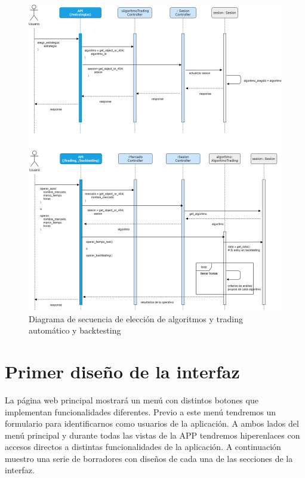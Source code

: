 \begin{figure}[h] 
	\includegraphics[width=1.35\textwidth]{imagenes/diagramas_secuencia/algoritmos_secuencia.png}
	\caption{Diagrama de secuencia de elección de algoritmos y trading automático y backtesting} \label{algoritmos_secuencia}
\end{figure}

\section{Primer diseño de la interfaz} \label{primer_diseño}

La página web principal mostrará un menú con distintos botones que implementan funcionalidades diferentes. Previo a este menú tendremos un formulario para identificarnos como usuarios de la aplicación. A ambos lados del menú principal y durante todas las vistas de la APP tendremos hiperenlaces con accesos directos a distintas funcionalidades de la aplicación. A continuación muestro una serie de borradores con diseños de cada una de las secciones de la interfaz.\newline

